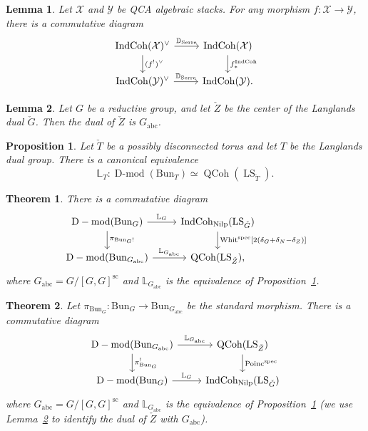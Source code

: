 \documentclass[10pt,a4paper]{amsart}
\newtheorem{prop}{Proposition}
\newtheorem{lemma}{Lemma}
\newtheorem{thm}{Theorem}
\newcommand{\Bun}{{\mathrm{Bun}}}
\DeclareMathOperator{\Dmod}{D-mod}
\DeclareMathOperator{\IndCoh}{IndCoh}
\DeclareMathOperator{\LS}{LS}
\newcommand{\Nilp}{\mathrm{Nilp}}
\newcommand{\Poinc}{\operatorname{Poinc}}
\DeclareMathOperator{\QCoh}{QCoh}
\newcommand{\Whit}{\operatorname{Whit}}
\newcommand{\abc}{{\mathrm{abc}}}
\newcommand{\bL}{\mathbb{L}}
\newcommand{\spec}{\mathrm{spec}}
\begin{document}
\begin{lemma}\label{lem:serre-duality}
    Let $\mathcal X$ and $\mathcal Y$ be QCA algebraic stacks. For any morphism $f\colon\mathcal X\to\mathcal Y$, there is a commutative diagram
    \[
    \begin{tikzcd}
        \IndCoh(\mathcal X)^\vee\arrow{r}{\mathbb D_{\mathrm{Serre}}}\arrow{d}{(f^!)^\vee}&\IndCoh(\mathcal X)\arrow{d}{f_*^{\IndCoh}}\\
        \IndCoh(\mathcal Y)^\vee\arrow{r}{\mathbb D_{\mathrm{Serre}}}&\IndCoh(\mathcal Y).
    \end{tikzcd}
    \]
\end{lemma}

\begin{lemma}\label{lem:dual-of-Z}
    Let $G$ be a reductive group, and let $\check Z$ be the center of the Langlands dual $\check G$. Then the dual of $\check Z$ is $G_\abc$.
\end{lemma}

\begin{prop}\label{prop:GLC-disconnected}
    Let $\check T$ be a possibly disconnected torus and let $T$ be the Langlands dual group. There is a canonical equivalence
    \begin{equation}\label{eq:disconnected-tori-equivalence}
    \mathbb L_T\colon \Dmod(\Bun_T)\simeq\QCoh(\LS_{\check T}).
    \end{equation}
\end{prop}

\begin{thm}\label{thm:laf1}
    There is a commutative diagram
    \[
    \begin{tikzcd}
        \Dmod(\Bun_G)\arrow{r}{\mathbb L_G}\arrow{d}{\pi_{\Bun_G!}}&\IndCoh_\Nilp(\LS_{\check G})\arrow{d}{\Whit^\spec[2(\delta_G+\delta_N-\delta_Z)]}\\
        \Dmod(\Bun_{G_{\mathrm{abc}}})\arrow{r}{\mathbb L_{G_{\mathrm{abc}}}}&\QCoh(\LS_{\check Z}),
    \end{tikzcd}
    \]
    where $G_{\mathrm{abc}}=G/[G,G]^{\mathrm{sc}}$ and $\bL_{G_\abc}$ is the equivalence of Proposition~\ref{prop:GLC-disconnected}.
\end{thm}

\begin{thm}\label{conj:lafforgue-Z}
    Let $\pi_{\Bun_G}\colon\Bun_G\to\Bun_{G_\abc}$ be the standard morphism. There is a commutative diagram
    \begin{equation}\label{eq:main-diagram}
    \begin{tikzcd}
    \Dmod(\Bun_{G_{\mathrm{abc}}})\arrow{r}{\mathbb L_{G_{\mathrm{abc}}}}\arrow{d}{\pi_{\Bun_G}^!}&\QCoh(\LS_{\check Z})\arrow{d}{\Poinc^\spec}\\
        \Dmod(\Bun_G)\arrow{r}{\mathbb L_G}&\IndCoh_\Nilp(\LS_{\check G})
    \end{tikzcd}
    \end{equation}
    where $G_{\mathrm{abc}}=G/[G,G]^{\mathrm{sc}}$ and $\bL_{G_\abc}$ is the equivalence of Proposition~\ref{prop:GLC-disconnected} (we use Lemma~\ref{lem:dual-of-Z} to identify the dual of $\check Z$ with $G_\abc$).
\end{thm}
\end{document}
